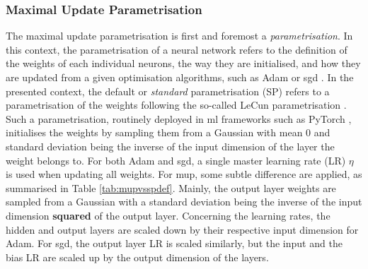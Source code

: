 \subsubsection{Maximal Update Parametrisation}
The maximal update parametrisation is first and foremost a \textit{parametrisation}. In this context, the parametrisation of a neural network refers to the definition of the weights of each individual neurons, the way they are initialised, and how they are updated from a given optimisation algorithms, such as Adam or \gls{sgd} \cite{adamPaper}. In the presented context, the default or \textit{standard} parametrisation (SP) refers to a parametrisation of the weights following the so-called LeCun parametrisation \cite{LeCun2012}. Such a parametrisation, routinely deployed in \gls{ml} frameworks such as PyTorch \cite{pytorch}, initialises the weights by sampling them from a Gaussian with mean 0 and standard deviation being the inverse of the input dimension of the layer the weight belongs to. For both Adam and \gls{sgd}, a single master learning rate (LR) $\eta$ is used when updating all weights. For \gls{mup}, some subtle difference are applied, as summarised in Table \ref{tab:mupvsspdef}. Mainly, the output layer weights are sampled from a Gaussian with a standard deviation being the inverse of the input dimension \textbf{squared} of the output layer. Concerning the learning rates, the hidden and output layers are scaled down by their respective input dimension for Adam. For \gls{sgd}, the output layer LR is scaled similarly, but the input and the bias LR are scaled up by the output dimension of the layers. 

